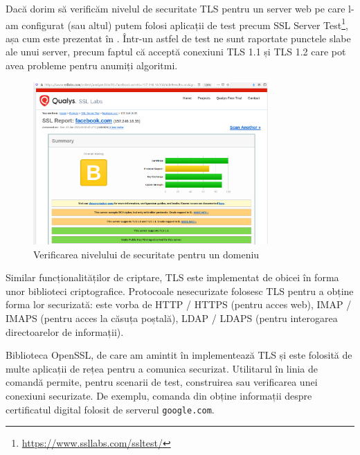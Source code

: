 Dacă dorim să verificăm nivelul de securitate TLS pentru un server web pe care l-am configurat (sau altul) putem folosi aplicații de test precum SSL Server Test\footnote{\url{https://www.ssllabs.com/ssltest/}}, așa cum este prezentat în . Într-un astfel de test ne sunt raportate punctele slabe ale unui server, precum faptul că acceptă conexiuni TLS 1.1 și TLS 1.2 care pot avea probleme pentru anumiți algoritmi.

\begin{figure}[!htbp]
  \centering
  \includegraphics[width=0.8\textwidth]{chapters/12-sec/img/ssllabs.png}
  \caption{Verificarea nivelului de securitate pentru un domeniu}
  \label{fig:sec:ssllabs}
\end{figure}

Similar funcționalităților de criptare, TLS este implementat de obicei în forma unor biblioteci criptografice. Protocoale nesecurizate folosesc TLS pentru a obține forma lor securizată: este vorba de HTTP / HTTPS (pentru acces web), IMAP / IMAPS (pentru acces la căsuța poștală), LDAP / LDAPS (pentru interogarea directoarelor de informații).

Biblioteca OpenSSL, de care am amintit în  implementează TLS și este folosită de multe aplicații de rețea pentru a comunica securizat. Utilitarul în linia de comandă  permite, pentru scenarii de test, construirea sau verificarea unei conexiuni securizate. De exemplu, comanda din  obține informații despre certificatul digital folosit de serverul \texttt{google.com}.


